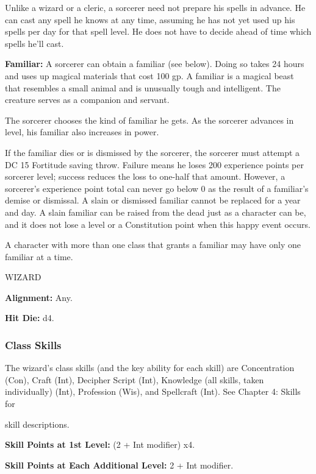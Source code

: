 \documentclass{article}
\begin{document}
Unlike a wizard or a cleric, a sorcerer need not prepare his spells in advance. 
He can cast any spell he knows at any time, assuming he has not yet used up his 
spells per day for that spell level. He does not have to decide ahead of time which 
spells he'll cast.

\textbf{Familiar:} A sorcerer can obtain a familiar (see below). Doing so takes 
24 hours and uses up magical materials that cost 100 gp. A familiar is a magical 
beast that resembles a small animal and is unusually tough and intelligent. The 
creature serves as a companion and servant.

The sorcerer chooses the kind of familiar he gets. As the sorcerer advances in 
level, his familiar also increases in power.

If the familiar dies or is dismissed by the sorcerer, the sorcerer must attempt 
a DC 15 Fortitude saving throw. Failure means he loses 200 experience points per 
sorcerer level; success reduces the loss to one-half that amount. However, a sorcerer's 
experience point total can never go below 0 as the result of a familiar's demise 
or dismissal. A slain or dismissed familiar cannot be replaced for a year and day. 
A slain familiar can be raised from the dead just as a character can be, and it 
does not lose a level or a Constitution point when this happy event occurs.

A character with more than one class that grants a familiar may have only one familiar 
at a time.

\vspace{12pt}
{\LARGE{}WIZARD}

\textbf{Alignment:} Any.

\textbf{Hit Die:} d4.

\vspace{12pt}
\subsubsection*{\textbf{Class Skills}}

The wizard's class skills (and the key ability for each skill) are Concentration 
(Con), Craft (Int), Decipher Script (Int), Knowledge (all skills, taken individually) 
(Int), Profession (Wis), and Spellcraft (Int). See Chapter 4: Skills for

skill descriptions.

\textbf{Skill Points at 1st Level:} (2 + Int modifier) x4.

\textbf{Skill Points at Each Additional Level:} 2 + Int modifier.
\end{document}
